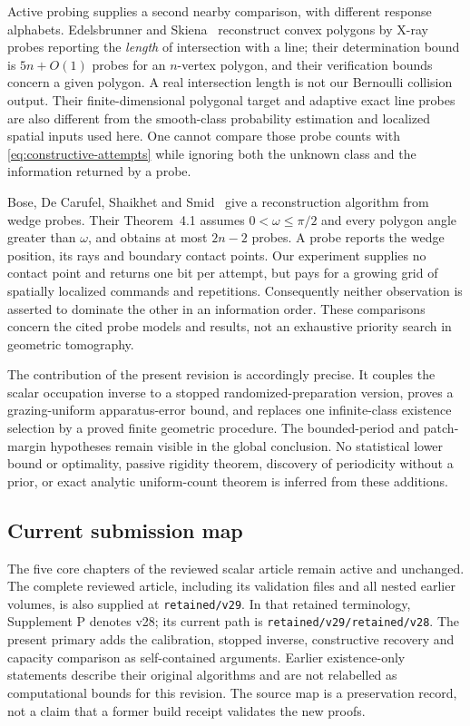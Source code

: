 Active probing supplies a second nearby comparison, with different
response alphabets. Edelsbrunner and Skiena~\cite{ES} reconstruct convex
polygons by X-ray probes reporting the \emph{length} of intersection
with a line; their determination bound is $5n+O(1)$ probes for an
$n$-vertex polygon, and their verification bounds concern a given
polygon. A real intersection length is not our Bernoulli collision
output. Their finite-dimensional polygonal target and adaptive exact
line probes are also different from the smooth-class probability
estimation and localized spatial inputs used here. One cannot compare
those probe counts with \eqref{eq:constructive-attempts} while ignoring
both the unknown class and the information returned by a probe.

Bose, De Carufel, Shaikhet and Smid~\cite{BCSS} give a reconstruction
algorithm from wedge probes. Their Theorem~4.1 assumes
$0<\omega\le\pi/2$ and every polygon angle greater than $\omega$,
and obtains at most $2n-2$ probes. A probe reports the wedge position,
its rays and boundary contact points. Our experiment supplies no contact
point and returns one bit per attempt, but pays for a growing grid of
spatially localized commands and repetitions. Consequently neither
observation is asserted to dominate the other in an information order.
These comparisons concern the cited probe models and results, not an
exhaustive priority search in geometric tomography.

The contribution of the present revision is accordingly precise. It
couples the scalar occupation inverse to a stopped randomized-preparation
version, proves a grazing-uniform apparatus-error bound, and replaces
one infinite-class existence selection by a proved finite geometric
procedure. The bounded-period and patch-margin hypotheses remain visible
in the global conclusion. No statistical lower bound or optimality,
passive rigidity theorem, discovery of periodicity without a prior, or
exact analytic uniform-count theorem is inferred from these additions.

\subsection*{Current submission map}
The five core chapters of the reviewed scalar article remain active and
unchanged. The complete reviewed article, including its validation files
and all nested earlier volumes, is also supplied at \texttt{retained/v29}.
In that retained terminology, Supplement P denotes v28; its current path
is \texttt{retained/v29/retained/v28}. The present primary adds the
calibration, stopped inverse, constructive recovery and capacity comparison
as self-contained arguments. Earlier existence-only statements describe
their original algorithms and are not relabelled as computational bounds
for this revision. The source map is a preservation record, not a claim
that a former build receipt validates the new proofs.
